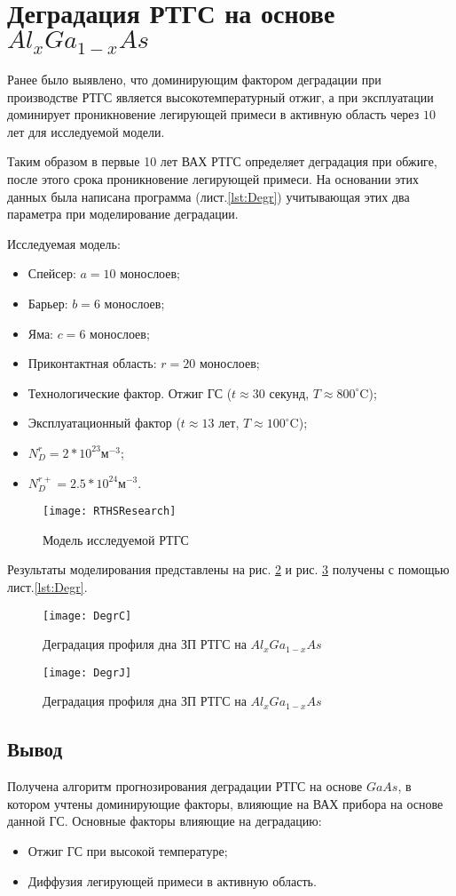 \section{Деградация РТГС на основе $Al_{x}Ga_{1-x}As$}

Ранее было выявлено, что доминирующим фактором деградации при производстве РТГС является высокотемпературный отжиг, а при эксплуатации доминирует проникновение легирующей примеси в активную область через $10$ лет для исследуемой модели.

Таким образом в первые 10 лет ВАХ РТГС определяет деградация при обжиге, после этого срока проникновение легирующей примеси. На основании этих данных была написана программа (лист.\ref{lst:Degr}) учитывающая этих два параметра при моделирование деградации.

Исследуемая модель:
\begin{itemize}
	\item Спейсер: $a = 10$ монослоев;
	\item Барьер: $b = 6$ монослоев;
	\item Яма: $c = 6$ монослоев;
	\item Приконтактная область: $r = 20$ монослоев;
	\item Технологические фактор. Отжиг ГС ($t\approx30$ секунд, $T\approx800^{\circ}$C);
	\item Эксплуатационный фактор ($t\approx 13$ лет, $T\approx100^{\circ}$C);
	\item $N_{D}^{r} = 2*10^{23}$м$^{-3}$;
	\item $N_{D}^{r+} = 2.5*10^{24}$м$^{-3}$.
\end{itemize} 

\begin{figure}[h!]
	\centering
	\texttt{[image: RTHSResearch]}
	\caption{Модель исследуемой РТГС} 
	\label{fig:RTHSResearch}
\end{figure}

Результаты моделирования представлены на рис. \ref{fig:DegrC} и
рис. \ref{fig:DegrJ} получены с помощью лист.\ref{lst:Degr}.
\begin{figure}[h!]
	\centering
	\texttt{[image: DegrC]}
	\caption{Деградация профиля дна ЗП РТГС на $Al_{x}Ga_{1-x}As$}
	\label{fig:DegrC}
\end{figure}

\begin{figure}[h!]
	\centering
	\texttt{[image: DegrJ]}
	\caption{Деградация профиля дна ЗП РТГС на $Al_{x}Ga_{1-x}As$}
	\label{fig:DegrJ}
\end{figure}

\subsection{Вывод}
Получена алгоритм прогнозирования деградации РТГС на основе $GaAs$, в котором учтены доминирующие факторы, влияющие на ВАХ прибора на основе данной ГС. Основные факторы влияющие на деградацию:
\begin{itemize}
	\item Отжиг ГС при высокой температуре;
	\item Диффузия легирующей примеси в активную область.
\end{itemize}